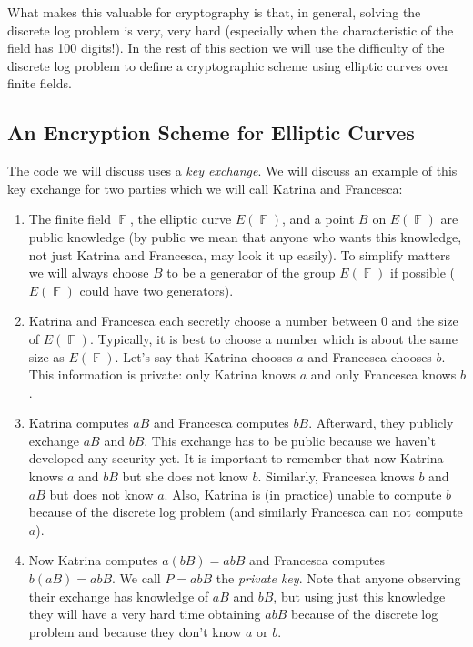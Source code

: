 \documentclass[12 pt]{article}
\DeclareMathOperator{\F}{\mathbb{F}}
\begin{document}
What makes this valuable for cryptography is that, in general, solving the discrete log problem is very, very hard (especially when the characteristic of the field has 100 digits!). In the rest of this section we will use the difficulty of the discrete log problem to define a cryptographic scheme using elliptic curves over finite fields.

\subsection{An Encryption Scheme for Elliptic Curves}
The code we will discuss uses a \emph{key exchange}. We will discuss an example of this key exchange for two parties which we will call Katrina and Francesca:
\begin{enumerate}
\item The finite field $\F$, the elliptic curve $E(\F)$, and a point $B$ on $E(\F)$ are public knowledge (by public we mean that anyone who wants this knowledge, not just Katrina and Francesca, may look it up easily). To simplify matters we will always choose $B$ to be a generator of the group $E(\F)$ if possible ($E(\F)$ could have two generators). 

\item Katrina and Francesca each secretly choose a number between 0 and the size of $E(\F)$. Typically, it is best to choose a number which is about the same size as $E(\F)$. Let's say that Katrina chooses $a$ and Francesca chooses $b$. This information is private: only Katrina knows $a$ and only Francesca knows $b$.

\item Katrina computes $aB$ and Francesca computes $bB$. Afterward, they publicly exchange $aB$ and $bB$. This exchange has to be public because we haven't developed any security yet. It is important to remember that now Katrina knows $a$ and $bB$ but she does not know $b$. Similarly, Francesca knows $b$ and $aB$ but does not know $a$. Also, Katrina is (in practice) unable to compute $b$ because of the discrete log problem (and similarly Francesca can not compute $a$).

\item Now Katrina computes $a(bB)=abB$ and Francesca computes $b(aB)=abB$. We call $P=abB$ the \emph{private key}. Note that anyone observing their exchange has knowledge of $aB$ and $bB$, but using just this knowledge they will have a very hard time obtaining $abB$ because of the discrete log problem and because they don't know $a$ or $b$. 
\end{enumerate}
\end{document}
